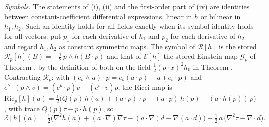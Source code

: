 \emph{Symbols.} The statements of (i), (ii) and the first-order part of (iv) are identities between constant-coefficient differential expressions, linear in $h$ or bilinear in $h_{1}, h_{2}$. Such an identity holds for all fields exactly when its symbol identity holds for all vectors: put $p_{1}$ for each derivative of $h_{1}$ and $p_{2}$ for each derivative of $h_{2}$ and regard $h_{1}, h_{2}$ as constant symmetric maps. The symbol of $\mathcal{R}[h]$ is the stored $\mathcal{R}_{p}[h](B) = -\tfrac12\,p \wedge h(B \cdot p)$ and that of $\mathcal{E}[h]$ the stored Einstein map $\mathcal{G}_{p}$ of Theorem , by the definition of both on the field $\tfrac12(p \cdot x)^{2}h_{0}$ in Theorem . Contracting $\mathcal{R}_{p}$: with $(e_{b} \wedge a) \cdot p = e_{b}(a \cdot p) - a\,(e_{b} \cdot p)$ and $e^{b} \cdot (p \wedge v) = (e^{b} \cdot p)v - (e^{b} \cdot v)p$, the Ricci map is $\mathrm{Ric}_{p}[h](a) = \tfrac12\bigl(Q(p)\,h(a) + (a \cdot p)\,\tau\,p - (a \cdot p)\,h(p) - (a \cdot h(p))\,p\bigr)$, with trace $Q(p)\tau - p \cdot h(p)$, so
\[
\mathcal{E}[h](a) = \tfrac12\bigl(\nabla^{2}h(a) + (a \cdot \nabla)\nabla\tau - (a \cdot \nabla)d - \nabla(a \cdot d)\bigr) - \tfrac12\,a\,\bigl(\nabla^{2}\tau - \nabla \cdot d\bigr).
\]

